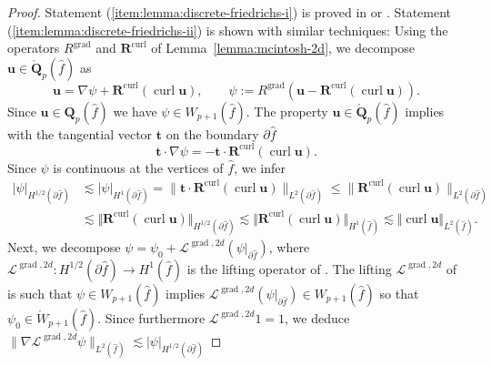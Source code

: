 \documentclass{article}
\begin{document}
\begin{proof}
Statement (\ref{item:lemma:discrete-friedrichs-i}) is proved in \cite[Lemma~6]%
{demkowicz-buffa05} or \cite[Lemma~{4.1}]{demkowicz08}. Statement
(\ref{item:lemma:discrete-friedrichs-ii}) is shown with similar techniques:
Using the operators $R^{\operatorname*{grad}}$ and ${\mathbf{R}}^{\operatorname*{curl}}$
of Lemma~\ref{lemma:mcintosh-2d}, we decompose ${\mathbf{u}}\in\mathring{\mathbf{Q}}_p(\widehat{f})$ as
\[
{\mathbf{u}}=\nabla\psi+{\mathbf{R}}^{\operatorname*{curl}}%
(\operatorname{curl}{\mathbf{u}}),\qquad\psi:=R^{\operatorname*{grad}%
}({\mathbf{u}}-{\mathbf{R}}^{\operatorname*{curl}}(\operatorname{curl}{\mathbf{u}})).
\]
Since ${\mathbf{u}}\in\mathbf{Q}_p(\widehat{f})$ we
have $\psi\in W_{p+1}(\widehat{f})$. The property ${\mathbf{u}}\in\mathring{\mathbf{Q}}_p(\widehat{f})$ 
implies with the tangential vector ${\mathbf{t}}$ on the boundary $\partial \widehat{f}$
\[
{\mathbf{t}}\cdot\nabla\psi=-{\mathbf{t}}\cdot{\mathbf{R}}%
^{\operatorname*{curl}}(\operatorname{curl}{\mathbf{u}}).
\]
Since $\psi$ is continuous at the vertices of $\widehat{f}$, we infer
\begin{align*}
|\psi|_{H^{1/2}(\partial \widehat{f})}  &  \lesssim|\psi|_{H^{1}(\partial \widehat{f})}%
= \|{\mathbf{t}}\cdot{\mathbf{R}}^{\operatorname*{curl}}(\operatorname{curl}{\mathbf{u}})\|_{L^{2}(\partial \widehat{f})}\leq\|{\mathbf{R}}^{\operatorname*{curl}%
}(\operatorname{curl}{\mathbf{u}})\|_{L^{2}(\partial \widehat{f})}\\
&  \lesssim\Vert{\mathbf{R}}^{\operatorname*{curl}}(\operatorname{curl}{\mathbf{u}})\Vert_{H^{1/2}(\partial \widehat{f})}\lesssim\Vert{\mathbf{R}%
}^{\operatorname*{curl}}(\operatorname{curl}{\mathbf{u}})\Vert_{H^{1}%
(\widehat{f})}\lesssim\Vert\operatorname{curl}{\mathbf{u}}\Vert_{L^{2}(\widehat{f})}.%
\end{align*}
Next, we decompose $\psi=\psi_{0}+{\mathcal{L}^{\operatorname{grad},2d}}(\psi|_{\partial \widehat{f}})$, where
${\mathcal{L}^{\operatorname{grad},2d}}:H^{1/2}(\partial \widehat{f})\rightarrow H^{1}(\widehat{f})$ is the lifting
operator of \cite{babuska-craig-mandel-pitkaranta91}. The lifting ${\mathcal L}^{\operatorname{grad},2d}$ of 
\cite{babuska-craig-mandel-pitkaranta91} is such that 
$\psi \in W_{p+1}(\widehat{f})$ 
implies ${\mathcal L}^{\operatorname{grad},2d}(\psi|_{\partial\widehat{f}}) \in W_{p+1}(\widehat f)$ 
so that $\psi_0 \in \mathring{W}_{p+1}(\widehat f)$. Since furthermore ${\mathcal L}^{\operatorname{grad},2d} 1 = 1$, 
we deduce $\|\nabla {\mathcal L}^{\operatorname{grad},2d} \psi\|_{L^2(\widehat f)} \lesssim |\psi|_{H^{1/2}(\partial \widehat f)}$ 

\end{proof}
\end{document}
